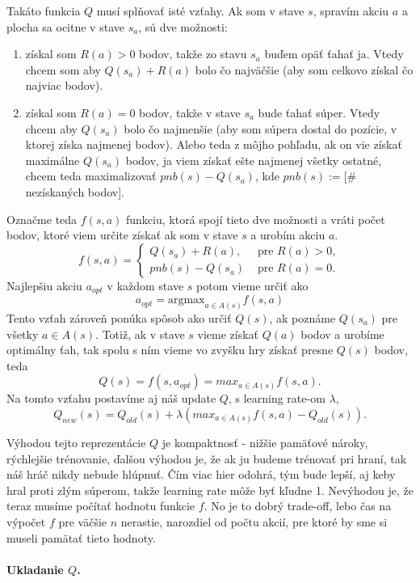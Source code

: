 \documentclass[10pt,a4paper]{article}
\begin{document}
Takáto funkcia $Q$ musí splňovať isté vzťahy. Ak som v stave $s$, spravím akciu $a$ a plocha sa ocitne v stave $s_a$, sú dve možnosti:
\begin{enumerate}
\item získal som $R(a)>0$ bodov, takže zo stavu $s_a$ buďem opäť ťahať ja. Vtedy chcem som aby $Q(s_a)+R(a)$ bolo čo najväčšie (aby som celkovo získal čo najviac bodov).
\item získal som $R(a)=0$ bodov, takže v stave $s_a$ bude ťahať súper. Vtedy chcem aby $Q(s_a)$ bolo čo najmenšie (aby som súpera dostal do pozície, v ktorej získa najmenej bodov). Alebo teda z môjho pohľadu, ak on vie získať maximálne $Q(s_a)$ bodov, ja viem získať ešte najmenej všetky ostatné,
chcem teda maximalizovať $pnb(s)-Q(s_a)$, kde $pnb(s):=$[\# nezískaných bodov].
\end{enumerate}
Označme teda $f(s,a)$ funkciu, ktorá spojí tieto dve možnosti a vráti počet bodov, ktoré viem určite získať ak som v stave $s$ a urobím akciu $a$.
$$f(s,a) = \left\lbrace \begin{array}{ll}
Q(s_a)+R(a), & \mbox{ pre } R(a)>0,\\
pnb(s)-Q(s_a) & \mbox { pre } R(a)=0.
\end{array}\right.
$$
Najlepšiu akciu $a_{opt}$ v každom stave $s$ potom vieme určiť ako 
$$ a_{opt} = \mbox{argmax}_{a\in A(s)} f(s,a)$$
Tento vzťah zároveň ponúka spôsob ako určiť $Q(s)$, ak poznáme $Q(s_a)$ pre všetky $a\in A(s).$
Totiž, ak v stave $s$ vieme získať $Q(a)$ bodov a urobíme optimálny ťah, tak spolu s ním vieme vo zvyšku hry získať presne $Q(s)$ bodov, teda 
$$Q(s) = f(s,a_{opt}) = max_{a\in A(s)}f(s,a).$$
Na tomto vzťahu postavíme aj náš update $Q$, s learning rate-om $\lambda$,
$$Q_{new}(s) = Q_{old}(s)+ \lambda(max_{a\in A(s)}f(s,a) - Q_{old}(s)).$$


Výhodou tejto reprezentácie $Q$ je kompaktnosť - nižšie pamäťové nároky, rýchlejšie trénovanie, 
ďalšou výhodou je, že ak ju budeme trénovať pri hraní, tak náš hráč nikdy nebude hlúpnuť. 
Čím viac hier odohrá, tým bude lepší, aj keby hral proti zlým súperom, takže learning rate môže byť kľudne 1.
Nevýhodou je, že teraz musíme počítať hodnotu funkcie $f$. No je to dobrý trade-off, lebo čas na výpočet $f$ pre väčšie $n$ nerastie, 
narozdiel od počtu akcií, pre ktoré by sme si museli pamätať tieto hodnoty.

\paragraph{Ukladanie $Q$.}
\end{document}
